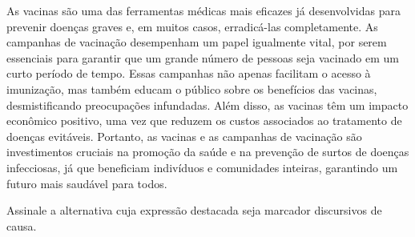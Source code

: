 \begin{myquote}



As vacinas são uma das ferramentas médicas mais eficazes já desenvolvidas para prevenir
doenças graves e, em muitos casos, erradicá-las completamente. As campanhas de
vacinação desempenham um papel igualmente vital, por serem essenciais para
garantir que um grande número de pessoas seja vacinado em um curto período de
tempo. Essas campanhas não apenas facilitam o acesso à imunização, mas também
educam o público sobre os benefícios das vacinas, desmistificando preocupações
infundadas. Além disso, as vacinas têm um impacto econômico positivo, uma vez
que reduzem os custos associados ao tratamento de doenças evitáveis. Portanto,
as vacinas e as campanhas de vacinação são investimentos cruciais na promoção
da saúde e na prevenção de surtos de doenças infecciosas, já que beneficiam
indivíduos e comunidades inteiras, garantindo um futuro mais saudável para
todos.


\end{myquote}

Assinale a alternativa cuja expressão destacada seja marcador discursivos de causa.

